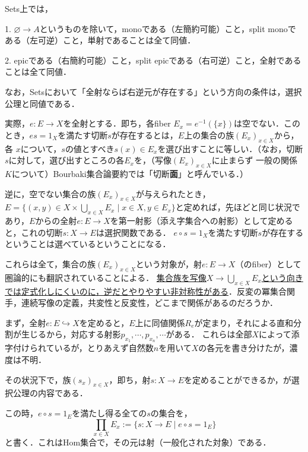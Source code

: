 \documentclass[uplatex, dvipdfmx]{jsarticle}
\begin{document}
\begin{example}
    Sets上では，
    
    1. $\varnothing\to A$というものを除いて，monoである（左簡約可能）こと，split monoである（左可逆）こと，単射であることは全て同値．
    
    2. epicである（右簡約可能）こと，split epicである（右可逆）こと，全射であることは全て同値．

    なお，Setsにおいて「全射ならば右逆元が存在する」という方向の条件は，選択公理と同値である．
    
    実際，$e:E\to X$を全射とする．即ち，各fiber $E_x=e^{-1}(\{x\})$は空でない．このとき，$es=1_X$を満たす切断$s$が存在するとは，$E$上の集合の族$(E_x)_{x\in X}$から，各
    $x$について，$s$の値とすべき$s(x)\in E_x$を選び出すことに等しい．（なお，切断$s$に対して，選び出すところの各$E_x$を，（写像$(E_x)_{x\in X}$に止まらず
    一般の関係$K$について）Bourbaki集合論要約では「切断\textbf{面}」と呼んでいる．）

    逆に，空でない集合の族$(E_x)_{x\in X}$が与えられたとき，$E=\{(x,y)\in X\times \bigcup_{x\in X}E_x\mid x\in X, y\in E_x\}$と定めれば，先ほどと同じ状況であり，$E$からの全射$e:E\to X$を第一射影（添え字集合への射影）として定めると，これの切断$s:X\to E$は選択関数である．
    $e\circ s=1_X$を満たす切断$s$が存在するということは選べているということになる．
\end{example}
\begin{remark*}
    これらは全て，集合の族$(E_x)_{x\in X}$という対象が，射$e:E\to X$（のfiber）として圏論的にも翻訳されていることによる．
    \underline{集合族を写像$X\to\bigcup_{x\in X}E_x$という向きでは定式化しにくいのに，逆だとやりやすい非対称性がある}．反変の冪集合関手，連続写像の定義，共変性と反変性，どこまで関係があるのだろうか．

    まず，全射$e:E\hookrightarrow X$を定めると，$E$上に同値関係$R_e$が定まり，それによる直和分割が生じるから，対応する射影$p_{x_1},\cdots,p_{x_n},\cdots$がある．
    これらは全部$X$によって添字付けられているが，とりあえず自然数$n$を用いて$X$の各元を書き分けたが，濃度は不明．
    \begin{center}
    \end{center}
    その状況下で，族$(s_x)_{x\in X}$，即ち，射$s:X\to E$を定めることができるか，が選択公理の内容である．

    この時，$e\circ s=1_E$を満たし得る全ての$s$の集合を，
    \[ \prod_{x\in X} E_x := \{ s:X\to E\mid e\circ s=1_E \}\]
    と書く．これはHom集合で，その元は射（一般化された対象）である．
\end{remark*}
\end{document}
